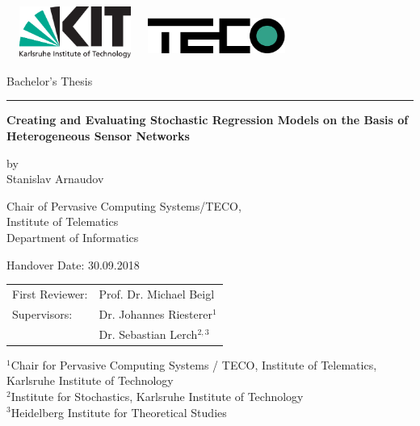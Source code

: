 \documentclass[12pt,a4paper,twoside]{scrartcl}
\numberwithin{equation}{section}
\begin{document}
\boldmath
\nonfrenchspacing

\pagestyle{empty}


\setlength{\parindent}{4em}
\setlength{\parskip}{1em}

\begin{titlepage}

  \begin{center}\large

    {\flushleft\includegraphics[height=17mm, width=45mm]{kit_logo_en.pdf} \hfill}
    \includegraphics[height=15mm, width=45mm]{group_logo.pdf}\quad\null

    \vspace*{1cm}
    {\Large Bachelor's Thesis}\\
    \noindent\hfil\rule{0.4\textwidth}{.4pt}\hfil
    \vspace*{1cm}

    {\bf\huge Creating and Evaluating Stochastic Regression Models on the Basis of Heterogeneous Sensor Networks\par} %
    \vspace*{5mm}

    by\\
    \vspace*{3mm}
    {\huge{Stanislav Arnaudov}}

    \vspace*{10mm}
    Chair of Pervasive Computing Systems/TECO,\\
    Institute of Telematics\\
    Department of Informatics\\
    \vspace*{15mm}

    Handover Date: 30.09.2018
    \vspace*{10mm}


    \begin{tabular}{p{5.5cm}l}
      First Reviewer: &Prof. Dr. Michael Beigl\\
      Supervisors: &Dr. Johannes Riesterer\(^1\) \\
      &Dr. Sebastian Lerch\(^{2,3}\)
    \end{tabular}

    \vspace*{8mm}


    \(^1\)Chair for Pervasive Computing Systems / TECO, Institute of Telematics, Karlsruhe Institute of Technology\\
    \(^2\)Institute for Stochastics, Karlsruhe Institute of Technology\\
    \(^3\)Heidelberg Institute for Theoretical Studies


  \end{center}

\end{titlepage}
\end{document}

